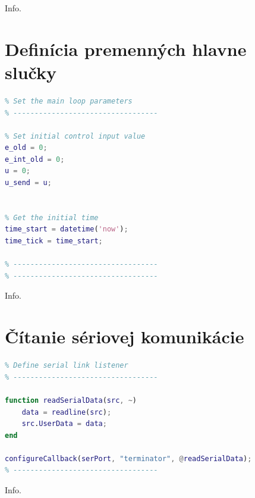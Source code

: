 \documentclass[a4paper, 10pt, ]{article}
\begin{document}
Info.

\section{Definícia premenných hlavne slučky}
\begin{lstlisting}[caption=Nastavenie premenných v hlavnej slučke., label={code:loop_vars}, language=Matlab]
% ----------------------------------
% Set the main loop parameters
% ----------------------------------

% Set initial control input value
e_old = 0;
e_int_old = 0;
u = 0;
u_send = u;


% Get the initial time
time_start = datetime('now');
time_tick = time_start;

% ----------------------------------
% ----------------------------------
\end{lstlisting}

Info.

\section{Čítanie sériovej komunikácie}
\begin{lstlisting}[caption=Definícia počúvateľa sériovej komunikácie., label={code:read}, language=Matlab]
% ----------------------------------
% Define serial link listener
% ----------------------------------

function readSerialData(src, ~) 
    data = readline(src);
    src.UserData = data;
end

configureCallback(serPort, "terminator", @readSerialData);
% ----------------------------------
\end{lstlisting}

Info.
\end{document}
